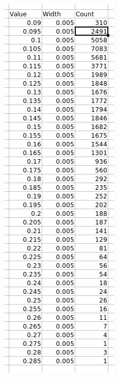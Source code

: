 \documentclass{article}
\begin{document}
\begin{figure}[H]
    \centering
    \begin{subfigure}{.25\textwidth}
        \centering
        \includegraphics[width=\textwidth]{images/excel_data.png}

\end{subfigure}
\end{figure}
\end{document}
